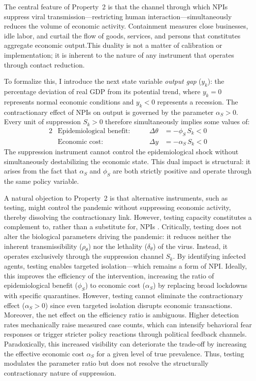 \documentclass[12pt, a4paper]{article}
\newcommand{\Sk}{S_k}
\begin{document}
The central feature of Property~2 is that the channel through which NPIs suppress viral transmission---restricting human interaction---simultaneously reduces the volume of economic activity. Containment measures close businesses, idle labor, and curtail the flow of goods, services, and persons that constitutes aggregate economic output.This duality is not a matter of calibration or implementation; it is inherent to the nature of any instrument that operates through contact reduction.

To formalize this, I introduce the next state variable \textit{output gap} ($y_k$): the percentage deviation of real GDP from its potential trend, where $y_k = 0$ represents normal economic conditions and $y_k < 0$ represents a recession. The contractionary effect of NPIs on output is governed by the parameter $\alpha_S > 0$. Every unit of suppression $\Sk > 0$ therefore simultaneously implies some values of:
%
\begin{alignat}{2}
&\text{Epidemiological benefit:} &\qquad \Delta\theta &= -\phi_S \, \Sk < 0 \label{eq:S_health}\\[4pt]
&\text{Economic cost:} &\qquad \Delta y &= -\alpha_S \, \Sk < 0 \label{eq:S_econ}
\end{alignat}
%
The suppression instrument cannot control the epidemiological shock without simultaneously destabilizing the economic state. This dual impact is structural: it arises from the fact that $\alpha_S$ and $\phi_S$ are both strictly positive and operate through the same policy variable.

A natural objection to Property~2 is that alternative instruments, such as testing, might control the pandemic without suppressing economic activity, thereby dissolving the contractionary link. However, testing capacity constitutes a complement to, rather than a substitute for, NPIs \citep{repec:nbr}.
Critically, testing does not alter the biological parameters driving the pandemic: it reduces neither the inherent transmissibility ($\rho_\theta$) nor the lethality ($\delta_\theta$) of the virus. Instead, it operates exclusively through the suppression channel $S_k$. By identifying infected agents, testing enables targeted isolation---which remains a form of NPI. Ideally, this improves the efficiency of the intervention, increasing the ratio of epidemiological benefit ($\phi_S$) to economic cost ($\alpha_S$) by replacing broad lockdowns with specific quarantines. However, testing cannot eliminate the contractionary effect ($\alpha_S > 0$) since even targeted isolation disrupts economic transactions. Moreover, the net effect on the efficiency ratio is ambiguous. Higher detection rates mechanically raise measured case counts, which can intensify behavioral fear responses or trigger stricter policy reactions through political feedback channels. Paradoxically, this increased visibility can deteriorate the trade-off by increasing the effective economic cost $\alpha_S$ for a given level of true prevalence. Thus, testing modulates the parameter ratio but does not resolve the structurally contractionary nature of suppression.
\end{document}

